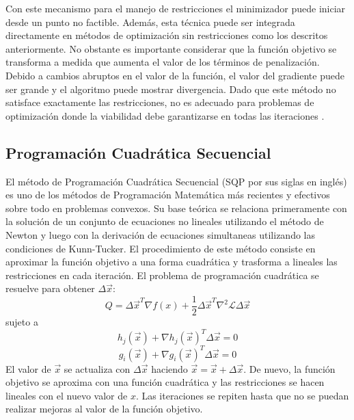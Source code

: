 Con este mecanismo para el manejo de restricciones el minimizador puede iniciar desde un punto no factible. Además, esta técnica puede ser integrada directamente en métodos de optimización sin restricciones como los descritos anteriormente. No obstante es importante considerar que la  función objetivo se transforma a medida que aumenta el valor de los términos de penalización. Debido a cambios abruptos en el valor de la función, el valor del gradiente puede ser grande y el algoritmo puede mostrar divergencia. Dado que este método no satisface exactamente las restricciones, no es adecuado para problemas de optimización donde la viabilidad debe garantizarse en todas las iteraciones \cite{arora_optimization:_2015}.

\subsection{Programación Cuadrática Secuencial}
El método de Programación Cuadrática Secuencial (SQP por sus siglas en inglés) es uno de los métodos de Programación Matemática más recientes y efectivos sobre todo en problemas convexos. Su base teórica se relaciona primeramente con la solución de un conjunto de ecuaciones no lineales utilizando el método de Newton y luego con la derivación de ecuaciones simultaneas utilizando las condiciones de Kunn-Tucker. El procedimiento de este método consiste en aproximar la función objetivo a una forma cuadrática y trasforma a lineales las restricciones en cada iteración. El problema de programación cuadrática se resuelve para obtener $\Delta \vec{x}$:
\begin{equation}
Q=\Delta \vec{x}^T \nabla f(x)+ \frac{1}{2}\Delta \vec{x}^T \nabla^2 \mathcal{L} \Delta \vec{x}
\end{equation}
sujeto a
\begin{equation}
h_j(\vec{x})+ \nabla h_j(\vec{x})^T \Delta \vec{x}=0
\end{equation}
\begin{equation}
g_i(\vec{x})+ \nabla g_i(\vec{x})^T \Delta \vec{x}=0
\end{equation}
El valor de $\vec{x}$ se actualiza con $\Delta \vec{x}$ haciendo  $\vec{x}=\vec{x}+\Delta \vec{x}$. De nuevo, la función objetivo se aproxima con una función cuadrática y las restricciones se hacen lineales con el nuevo valor de $x$. Las iteraciones se repiten hasta que no se puedan realizar mejoras al valor de la función objetivo.
